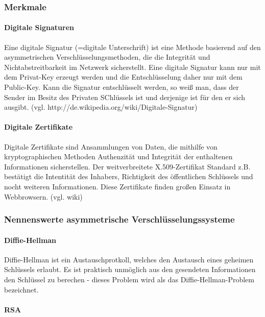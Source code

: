 \documentclass[12pt,a4paper]{report}
\begin{document}
\subsubsection{Merkmale}

\paragraph{Digitale Signaturen}

Eine digitale Signatur (=digitale Unterschrift) ist eine Methode basierend auf den asymmetrischen Verschlüsselungsmethoden, die die Integrität und Nichtabstreitbarkeit im Netzwerk sicherstellt. Eine digitale Signatur kann nur mit dem Privat-Key erzeugt werden und die Entschlüsselung daher nur mit dem Public-Key. Kann die Signatur entschlüsselt werden, so weiß man, dass der Sender im Besitz des Privaten SChlüssels ist und derjenige ist für den er sich ausgibt. (vgl. http://de.wikipedia.org/wiki/Digitale-Signatur)

\paragraph{Digitale Zertifikate}

Digitale Zertifikate sind Ansammlungen von Daten, die mithilfe von kryptographischen Methoden Authenzität und Integrität der enthaltenen Informationen sicherstellen. Der weitverbreitete X.509-Zertifikat Standard z.B. bestätigt die Intentität des Inhabers, Richtigkeit des öffentlichen Schlüssels und nocht weiteren Informationen. Diese Zertifikate finden großen Einsatz in Webbrowsern. (vgl. wiki)

\subsubsection{Nennenswerte asymmetrische Verschlüsselungssysteme}

\paragraph{Diffie-Hellman}

Diffie-Hellman ist ein Austauschprotkoll, welches den Austausch eines geheimen Schlüssels erlaubt. Es ist praktisch unmöglich aus den gesendeten Informationen den Schlüssel zu berechen - dieses Problem wird als das Diffie-Hellman-Problem bezeichnet.

\paragraph{RSA}
\end{document}
